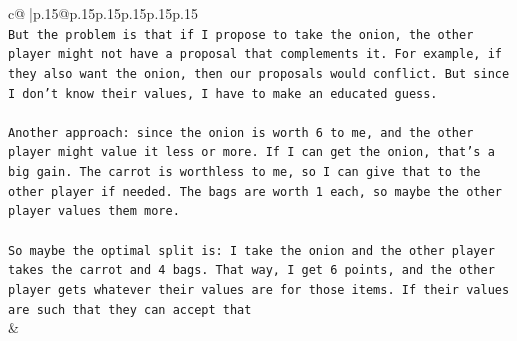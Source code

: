 \documentclass{article}
\begin{document}
{\begin{supertabular}{c@{$\;$}|p{.15\linewidth}@{}p{.15\linewidth}p{.15\linewidth}p{.15\linewidth}p{.15\linewidth}p{.15\linewidth}}
{{{\\ 
\texttt{But the problem is that if I propose to take the onion, the other player might not have a proposal that complements it. For example, if they also want the onion, then our proposals would conflict. But since I don't know their values, I have to make an educated guess.} \\
\\ 
\texttt{Another approach: since the onion is worth 6 to me, and the other player might value it less or more. If I can get the onion, that's a big gain. The carrot is worthless to me, so I can give that to the other player if needed. The bags are worth 1 each, so maybe the other player values them more.} \\
\\ 
\texttt{So maybe the optimal split is: I take the onion and the other player takes the carrot and 4 bags. That way, I get 6 points, and the other player gets whatever their values are for those items. If their values are such that they can accept that} \\
            }
        }
    }
    & \\ \\


\end{supertabular}}
\end{document}
